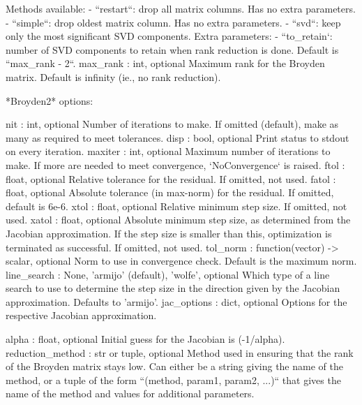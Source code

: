 \begin{DoxyVerb}
                Methods available:
                    - ``restart``: drop all matrix columns. Has no
                        extra parameters.
                    - ``simple``: drop oldest matrix column. Has no
                        extra parameters.
                    - ``svd``: keep only the most significant SVD
                        components.
                      Extra parameters:
                          - ``to_retain`: number of SVD components to
                              retain when rank reduction is done.
                              Default is ``max_rank - 2``.
            max_rank : int, optional
                Maximum rank for the Broyden matrix.
                Default is infinity (ie., no rank reduction).

*Broyden2* options:

    nit : int, optional
        Number of iterations to make. If omitted (default), make as many
        as required to meet tolerances.
    disp : bool, optional
        Print status to stdout on every iteration.
    maxiter : int, optional
        Maximum number of iterations to make. If more are needed to
        meet convergence, `NoConvergence` is raised.
    ftol : float, optional
        Relative tolerance for the residual. If omitted, not used.
    fatol : float, optional
        Absolute tolerance (in max-norm) for the residual.
        If omitted, default is 6e-6.
    xtol : float, optional
        Relative minimum step size. If omitted, not used.
    xatol : float, optional
        Absolute minimum step size, as determined from the Jacobian
        approximation. If the step size is smaller than this, optimization
        is terminated as successful. If omitted, not used.
    tol_norm : function(vector) -> scalar, optional
        Norm to use in convergence check. Default is the maximum norm.
    line_search : {None, 'armijo' (default), 'wolfe'}, optional
        Which type of a line search to use to determine the step size in
        the direction given by the Jacobian approximation. Defaults to
        'armijo'.
    jac_options : dict, optional
        Options for the respective Jacobian approximation.

        alpha : float, optional
            Initial guess for the Jacobian is (-1/alpha).
        reduction_method : str or tuple, optional
            Method used in ensuring that the rank of the Broyden
            matrix stays low. Can either be a string giving the
            name of the method, or a tuple of the form ``(method,
            param1, param2, ...)`` that gives the name of the
            method and values for additional parameters.


\end{DoxyVerb}
